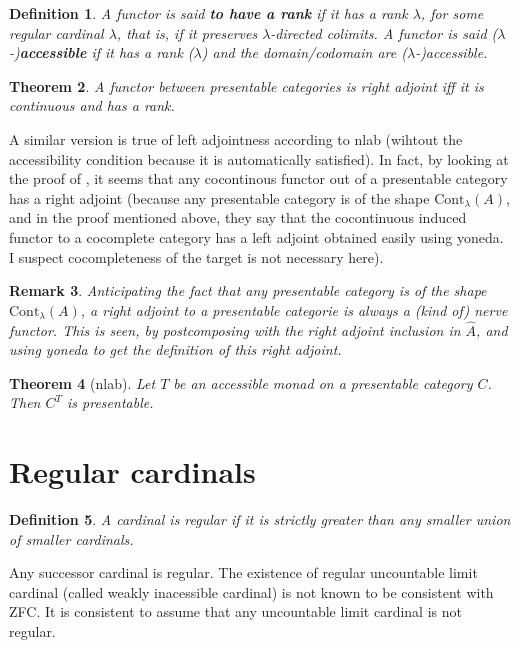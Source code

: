 \documentclass{article}
\newcommand{\Cont}[1]{\text{Cont}_{#1}}
\newtheorem{theorem}{Theorem}[section]
\newtheorem{definition}[theorem]{Definition}
\newtheorem{remark}[theorem]{Remark}
\begin{document}
\begin{definition}
 A functor is said \textbf{to have a rank}  if it has a rank $\lambda$,
 for some regular cardinal $\lambda$, that is, if it
  preserves $\lambda$-directed colimits.
  A functor is said ($\lambda$-)\textbf{accessible} if it has a rank ($\lambda$) and the domain/codomain
  are ($\lambda$-)accessible.
\end{definition}
\begin{theorem}
  \cite[1.66]{adamek_rosicky}
  A functor between presentable categories is right adjoint iff it is continuous
  and has a rank.
  \end{theorem}
  A similar version is true of left adjointness according to nlab (wihtout the
  accessibility condition because it is automatically satisfied).
  In fact, by looking at the proof of \cite[Representation theorem 1.45]{adamek_rosicky}, it seems that any cocontinous functor out of a presentable category
  has a right adjoint (because any presentable category is of the shape $\Cont\lambda(A)$, and in the proof mentioned above, they say that the cocontinuous induced functor to a cocomplete category has a left adjoint obtained easily using yoneda. I suspect cocompleteness of the target is not necessary here).

  \begin{remark}
	  Anticipating the fact that any presentable category is of the shape $\Cont\lambda(A)$,
	  a right adjoint to a presentable categorie is always a (kind of) nerve functor. This is seen, by postcomposing with the right adjoint inclusion in $\hat{A}$, and using yoneda to get the definition of this right adjoint.
  \end{remark}

  \begin{theorem}[nlab]
   Let $T$  be an accessible monad on a presentable category $C$.
   Then $C^T$ is presentable.
  \end{theorem}

\section{Regular cardinals}
\begin{definition}
 A cardinal is regular if it is strictly greater than any smaller union of smaller cardinals.
\end{definition}
Any successor cardinal is regular. The existence of regular uncountable limit
cardinal (called weakly inacessible cardinal) is not known to be consistent with
ZFC. It is consistent to assume that any uncountable limit cardinal is not regular.
\end{document}
